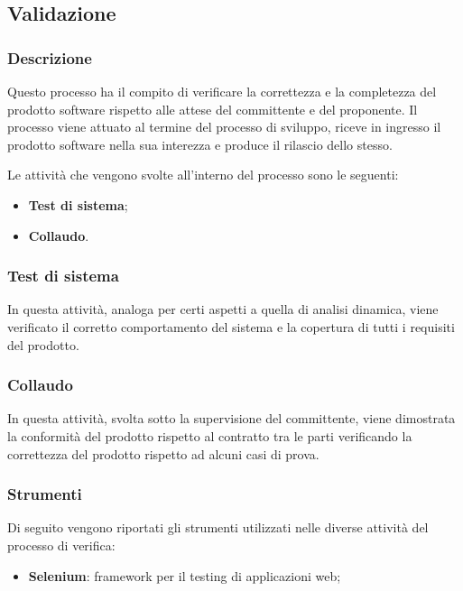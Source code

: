 \subsection{Validazione}
\label{sub:validazione}

\subsubsection{Descrizione}
\label{ssub:descrizione}

Questo processo ha il compito di verificare la correttezza e la completezza del prodotto software rispetto alle attese del committente e
del proponente. Il processo viene attuato al termine del processo di sviluppo, riceve in ingresso il prodotto software nella sua interezza
e produce il rilascio dello stesso.

Le attività che vengono svolte all'interno del processo sono le seguenti:
\begin{itemize}
	\item \textbf{Test di sistema};
	\item \textbf{Collaudo}.
\end{itemize}

\subsubsection{Test di sistema}
\label{ssub:validazione:test_sistema}

In questa attività, analoga per certi aspetti a quella di analisi dinamica, viene verificato il corretto comportamento del sistema e la
copertura di tutti i requisiti del prodotto.

\subsubsection{Collaudo}
\label{ssub:validazione:collaudo}

In questa attività, svolta sotto la supervisione del committente, viene dimostrata la conformità del prodotto rispetto al contratto tra le
parti verificando la correttezza del prodotto rispetto ad alcuni casi di prova.

\subsubsection{Strumenti}
\label{ssub:validazione:strumenti}

Di seguito vengono riportati gli strumenti utilizzati nelle diverse attività del processo di verifica:
\begin{itemize}
	\item \textbf{Selenium}: framework per il testing di applicazioni web;
\end{itemize}
